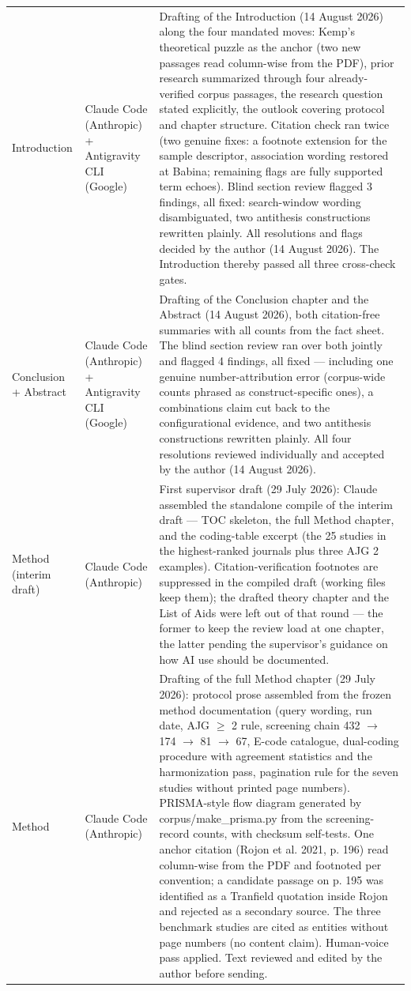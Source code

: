 \begin{longtable}{@{}p{2.9cm}p{3.2cm}p{9.0cm}@{}}
\addlinespace
Introduction & Claude Code (Anthropic) + Antigravity CLI (Google) & Drafting of the Introduction (14 August 2026) along the four mandated moves: Kemp's theoretical puzzle as the anchor (two new passages read column-wise from the PDF), prior research summarized through four already-verified corpus passages, the research question stated explicitly, the outlook covering protocol and chapter structure. Citation check ran twice (two genuine fixes: a footnote extension for the sample descriptor, association wording restored at Babina; remaining flags are fully supported term echoes). Blind section review flagged 3 findings, all fixed: search-window wording disambiguated, two antithesis constructions rewritten plainly. All resolutions and flags decided by the author (14 August 2026). The Introduction thereby passed all three cross-check gates. \\
\addlinespace
Conclusion + Abstract & Claude Code (Anthropic) + Antigravity CLI (Google) & Drafting of the Conclusion chapter and the Abstract (14 August 2026), both citation-free summaries with all counts from the fact sheet. The blind section review ran over both jointly and flagged 4 findings, all fixed --- including one genuine number-attribution error (corpus-wide counts phrased as construct-specific ones), a combinations claim cut back to the configurational evidence, and two antithesis constructions rewritten plainly. All four resolutions reviewed individually and accepted by the author (14 August 2026). \\
\addlinespace
Method (interim draft) & Claude Code (Anthropic) & First supervisor draft (29 July 2026): Claude assembled the standalone compile of the interim draft --- TOC skeleton, the full Method chapter, and the coding-table excerpt (the 25 studies in the highest-ranked journals plus three AJG 2 examples). Citation-verification footnotes are suppressed in the compiled draft (working files keep them); the drafted theory chapter and the List of Aids were left out of that round --- the former to keep the review load at one chapter, the latter pending the supervisor's guidance on how AI use should be documented. \\
\addlinespace
Method & Claude Code (Anthropic) & Drafting of the full Method chapter (29 July 2026): protocol prose assembled from the frozen method documentation (query wording, run date, AJG $\geq$ 2 rule, screening chain 432 $\rightarrow$ 174 $\rightarrow$ 81 $\rightarrow$ 67, E-code catalogue, dual-coding procedure with agreement statistics and the harmonization pass, pagination rule for the seven studies without printed page numbers). PRISMA-style flow diagram generated by corpus/make\_prisma.py from the screening-record counts, with checksum self-tests. One anchor citation (Rojon et al. 2021, p. 196) read column-wise from the PDF and footnoted per convention; a candidate passage on p. 195 was identified as a Tranfield quotation inside Rojon and rejected as a secondary source. The three benchmark studies are cited as entities without page numbers (no content claim). Human-voice pass applied. Text reviewed and edited by the author before sending. \\

\end{longtable}

